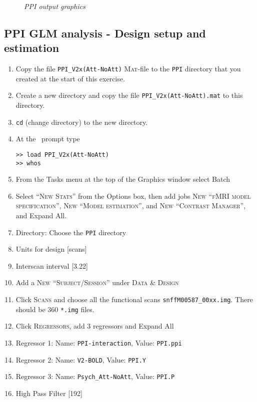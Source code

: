 \begin{figure}[!ht]
\centering{}
\caption{\em PPI output graphics}
\label{ppi_fig9}
\end{figure}

\subsection{PPI GLM analysis - Design setup and estimation}

\begin{enumerate}
\item Copy the file \texttt{PPI\_V2x(Att-NoAtt)} \textsc{Mat}-file to the \texttt{PPI} directory that you created at the start of this exercise.
\item Create a new directory and copy the file \texttt{PPI\_V2x(Att-NoAtt).mat} to this directory.
\item \texttt{cd} (change directory) to the new directory.
\item At the \matlab\ prompt type
\begin{verbatim}
>> load PPI_V2x(Att-NoAtt)
>> whos
\end{verbatim}
\item From the Tasks menu at the top of the Graphics window select Batch
\item Select \textsc{``New Stats''} from the Options box, then add jobs \textsc{New ``fMRI model specification''}, \textsc{New ``Model estimation''}, and \textsc{New ``Contrast Manager''}, and Expand All.
\item Directory: Choose the \texttt{PPI} directory
\item Units for design [scans]
\item Interscan interval [3.22]
\item Add a \textsc{New ``Subject/Session''} under \textsc{Data \& Design}
\item Click \textsc{Scans} and choose all the functional scans \texttt{snffM00587\_00xx.img}. There should be 360 \texttt{*.img} files.
\item Click \textsc{Regressors}, add 3 regressors and Expand All
\item Regressor 1: Name: \texttt{PPI-interaction}, Value: \texttt{PPI.ppi}
\item Regressor 2: Name: \texttt{V2-BOLD}, Value: \texttt{PPI.Y}
\item Regressor 3: Name: \texttt{Psych\_Att-NoAtt}, Value: \texttt{PPI.P}
\item High Pass Filter [192]

\end{enumerate}
